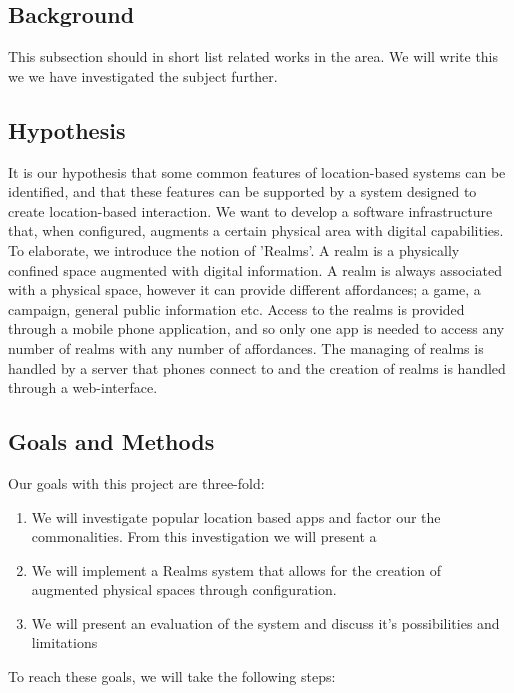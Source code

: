 \subsection{Background} %
\label{sub:background}
This subsection should in short list related works in the area. We will write this we we have investigated the subject further.


\subsection{Hypothesis} %
\label{sub:hypothesis}
It is our hypothesis that some common features of location-based systems can be identified, and that these features can be supported by a system designed to create location-based interaction. We want to develop a software infrastructure that, when configured, augments a certain physical area with digital capabilities. To elaborate, we introduce the notion of 'Realms'. A realm is a physically confined space augmented with digital information. A realm is always associated with a physical space, however it can provide different affordances; a game, a campaign, general public information etc. Access to the realms is provided through a mobile phone application, and so only one app is needed to access any number of realms with any number of affordances. The managing of realms is handled by a server that phones connect to and the creation of realms is handled through a web-interface. 

\subsection{Goals and Methods} %
\label{sub:goals_and_methods}
Our goals with this project are three-fold:

\begin{enumerate}
	\item We will investigate popular location based apps and factor our the commonalities. From this investigation we will present a 
	\item We will implement a Realms system that allows for the creation of augmented physical spaces through configuration. 
	\item We will present an evaluation of the system and discuss it's possibilities and limitations
\end{enumerate}

\noindent To reach these goals, we will take the following steps:

